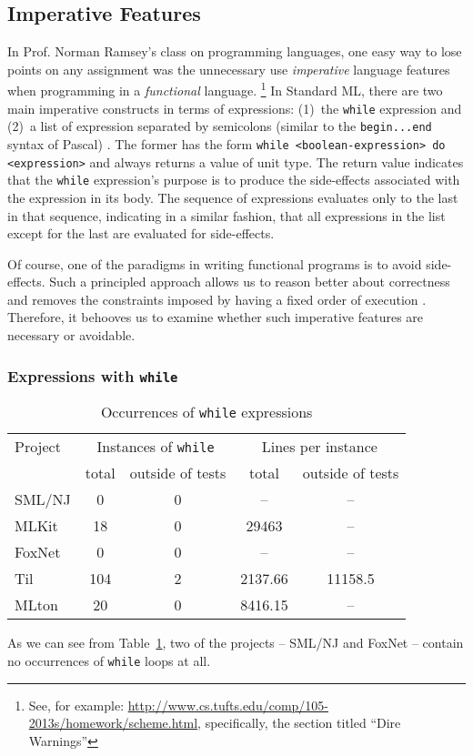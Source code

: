 \documentclass[12pt,abstracton]{scrartcl}
\begin{document}
\subsection{Imperative Features}\label{subsec:imper}
In Prof. Norman Ramsey's class on programming languages, one easy way to lose points
on any assignment was the unnecessary use \emph{imperative} language features when programming in a \emph{functional} language.
\footnote{See, for example: \url{http://www.cs.tufts.edu/comp/105-2013s/homework/scheme.html}, specifically, the section titled ``Dire Warnings''}
In Standard ML, there are two main imperative constructs in terms of expressions:
(1)~the \texttt{while} expression and (2)~a list of expression separated by semicolons (similar to the \texttt{begin...end} syntax of Pascal) \cite{Ull98}.
The former has the form \texttt{while <boolean-expression> do <expression>} and always returns a value of unit type.
The return value indicates that the \texttt{while} expression's purpose is to produce the side-effects associated
with the expression in its body. The sequence of expressions evaluates only to the last in that sequence, indicating
in a similar fashion, that all expressions in the list except for the last are evaluated for side-effects.

Of course, one of the paradigms in writing functional programs is to avoid side-effects.
Such a principled approach allows us to reason better about correctness and
removes the constraints imposed by having a fixed order of execution \cite{Hug90}. Therefore,
it behooves us to examine whether such imperative features are necessary or avoidable.
\subsubsection{Expressions with \texttt{while}}
\begin{table}[h!]
\centering
\begin{tabular}{|l||c|c||c|c|}
\hline
Project & \multicolumn{2}{c||}{Instances of \texttt{while}} & \multicolumn{2}{c|}{Lines per instance} \\ \cline{2-3}\cline{4-5}
 & total & outside of tests & total & outside of tests \\ \hline\hline
SML/NJ & 0 & 0 & -- & --\\
MLKit & 18 & 0 & 29463 & --\\
FoxNet & 0 & 0 & -- & -- \\
Til & 104 & 2 & 2137.66 & 11158.5 \\
MLton & 20 & 0 & 8416.15 & --\\ \hline
\end{tabular}
\caption{Occurrences of \texttt{while} expressions}
\label{table:while}
\end{table}
As we can see from Table~\ref{table:while}, two of the projects -- SML/NJ and FoxNet -- contain no occurrences
of \texttt{while} loops at all.
\end{document}
